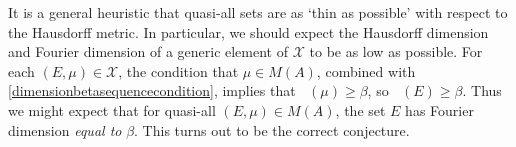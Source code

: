\documentclass[12pt,reqno]{article}
\numberwithin{equation}{section}
\DeclareMathOperator{\fordim}{\dim_{\mathbf{F}}}
\DeclareMathOperator{\TT}{\mathbf{T}}
\newtheorem{lemma}[theorem]{Lemma}
\begin{document}
\begin{comment}

\begin{lemma}
    For quasi-all $(E,\mu) \in \mathcal{X}$, $\text{supp}(\mu) = E$.
\end{lemma}
\begin{proof}
    For each closed set $K \subset \TT^d$ with nonempty interior, let $A(K)$ be the family of all $(E,\mu) \in X$ such that $E \cap K \neq \emptyset$ and $\mu(K) = 0$. The set $A(K)$ is clearly closed in $X$. Moreover, this set is nowhere dense; Fix $(E,\mu) \in A(K)$ and $\varepsilon > 0$. Then we can find a smooth probability density $\psi \in C^\infty(\TT^d)$ supported on $K^\circ \cap E_\varepsilon$. We then define $\mu_\varepsilon = (1 - \varepsilon) \mu + \varepsilon \psi$. Now
    \[ \| \mu - \mu_\varepsilon \|_A \leq \varepsilon \left( \| \mu \|_A + \| \psi \|_A \right) \lesssim \varepsilon. \]
    Moreover, $\mu_\varepsilon$ is supported on $\overline{E_\varepsilon}$, so
    \[ d_X((E,\mu), (\overline{E_\varepsilon}, \mu_\varepsilon)) \lesssim \varepsilon. \]
    If we let $A = \bigcup_{n = 1}^\infty A(K_n)$, where $\{ K_n \}$ is the family of all closed cubes in $\TT^d$ whose corners have rational coordinates, then quasi-all $(E,\mu) \in X$ belong to $A^c$. But $A^c$ is precisely the family of pairs $(E,\mu)$ with $\text{supp}(\mu) = E$.
\end{proof}

\end{comment}

It is a general heuristic that quasi-all sets are as `thin as possible' with respect to the Hausdorff metric. In particular, we should expect the Hausdorff dimension and Fourier dimension of a generic element of $\mathcal{X}$ to be as low as possible. For each $(E,\mu) \in \mathcal{X}$, the condition that $\mu \in M(A)$, combined with \eqref{dimensionbetasequencecondition}, implies that $\fordim(\mu) \geq \beta$, so $\fordim(E) \geq \beta$. Thus we might expect that for quasi-all $(E,\mu) \in M(A)$, the set $E$ has Fourier dimension \emph{equal to} $\beta$. This turns out to be the correct conjecture.
\end{document}
